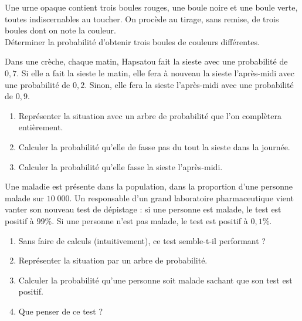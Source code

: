 \documentclass[11pt]{article}
\begin{document}
\begin{exo}
Une urne opaque contient trois boules rouges, une boule
noire et une boule verte, toutes indiscernables au toucher. On procède au
tirage, sans remise, de trois boules dont on note la couleur.\\
Déterminer la probabilité d'obtenir trois boules de couleurs différentes.
\end{exo}

\begin{exo}
Dans une crèche, chaque matin, Hapsatou fait la sieste
avec une probabilité de $0,7$. Si elle a fait la sieste le matin, elle fera à
nouveau la sieste l'après-midi avec une probabilité de $0,2$. Sinon, elle fera
la sieste l'après-midi avec une probabilité de $0,9$.
\begin{enumerate}
  \item Représenter la situation avec un arbre de probabilité que l'on
    complètera entièrement.
  \item Calculer la probabilité qu'elle de fasse pas du tout la sieste dans la
    journée.
  \item Calculer la probabilité qu'elle fasse la sieste l'après-midi.
\end{enumerate}
\end{exo}

\begin{exo}
Une maladie est
présente dans la population, dans la proportion d'une personne malade sur
$10\;000$. Un responsable d'un grand laboratoire pharmaceutique vient
vanter son nouveau test de dépistage : si une personne est malade, le test est
positif à $99\%$. Si une personne n'est pas malade, le test est positif à
$0,1\%$.
\begin{enumerate}
  \item Sans faire de calculs (intuitivement), ce test semble-t-il performant ?
  \item Représenter la situation par un arbre de probabilité.
  \item Calculer la probabilité qu'une personne soit malade sachant que son test
    est positif.
  \item Que penser de ce test ?
\end{enumerate}
\end{exo}
\end{document}
